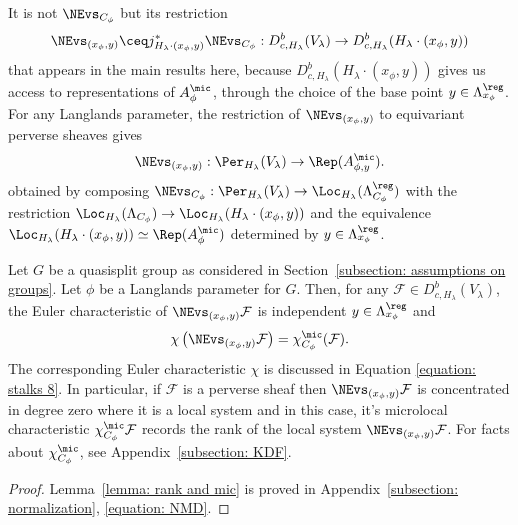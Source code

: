 \documentclass[11pt,letterpaper]{amsart}
\numberwithin{equation}{section}
\begin{document}
It is not $\NEvs_{C_\phi}$ but its restriction 
\begin{equation}
\NEvs_{(x_\phi,y)} \ceq j^*_{{H_\lambda}\cdot(x_\phi,y)} \NEvs_{C_\phi} : D^b_{c,H_\lambda}(V_\lambda) \to D^b_{c,H_\lambda}({H_\lambda}\cdot(x_\phi,y))
\end{equation}
that appears in the main results here, because $D^b_{c,H_\lambda}({H_\lambda}\cdot(x_\phi,y))$ gives us access to representations of $A^\mic_\phi$, through the choice of the base point $y\in \Lambda^\reg_{x_\phi}$.
For any Langlands parameter, the restriction of $\NEvs_{(x_\phi,y)}$ to equivariant perverse sheaves gives
\[
\NEvs_{(x_\phi,y)} : \Per_{H_\lambda}(V_\lambda) \to \Rep(A^\mic_{\phi,y}).
\]
obtained by composing $\NEvs_{C_{\phi}} : \Per_{H_\lambda}(V_\lambda) \to \Loc_{H_\lambda}(\Lambda^\reg_{C_\phi})$ with the restriction 
$\Loc_{H_\lambda}(\Lambda_{C_\phi}) \to \Loc_{H_\lambda}({H_\lambda}\cdot(x_\phi, y))$
and the equivalence $\Loc_{H_\lambda}({H_\lambda}\cdot(x_\phi, y)) \simeq \Rep(A^\mic_{\phi})$ determined by $y \in \Lambda_{x_\phi}^\reg$.

\begin{lemma}\label{lemma: rank and mic}
    Let $G$ be a quasisplit group as considered in Section~\ref{subsection: assumptions on groups}. 
    Let $\phi$ be a Langlands parameter for $G$.
    Then, for any $\mathcal{F}\in D^b_{c,H_\lambda}(V_\lambda)$, the Euler characteristic of $\NEvs_{(x_\phi,y)} \mathcal{F}$ is independent  $y\in \Lambda_{x_\phi}^\reg$ and
\[
 \chi\left(\NEvs_{(x_\phi,y)} \mathcal{F} \right)
=
\chi^\mic_{C_\phi}(\mathcal{F}).
\]
The corresponding Euler characteristic $\chi$ is discussed in Equation
\eqref{equation: stalks 8}.
In particular, if $\mathcal{F}$ is a perverse sheaf then $\NEvs_{(x_\phi,y)} \mathcal{F}$ is concentrated in  degree zero where it is a local system and in this case, it's microlocal characteristic $\chi^\mic_{C_\phi}\mathcal{F}$ records the rank of the local system $\NEvs_{(x_\phi,y)} \mathcal{F}$.
For facts about $\chi^\mic_{C_\phi}$, see Appendix~\ref{subsection: KDF}.
\end{lemma}

\begin{proof}
Lemma~\ref{lemma: rank and mic} is proved in Appendix~\ref{subsection: normalization}, \eqref{equation: NMD}.
\end{proof}
\end{document}
